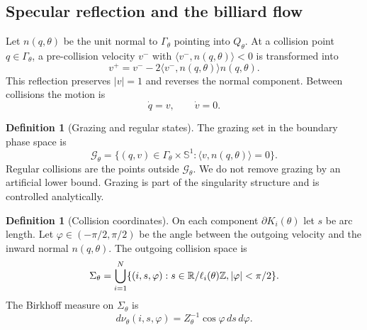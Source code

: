 \documentclass[12pt, letterpaper]{amsart}
\newcommand{\R}{\mathbb{R}}
\newcommand{\Z}{\mathbb{Z}}
\theoremstyle{plain}
\theoremstyle{definition}
\newtheorem{definition}[theorem]{Definition}
\theoremstyle{remark}
\begin{document}
\subsection{Specular reflection and the billiard flow}

Let $n(q,\theta)$ be the unit normal to $\Gamma_\theta$ pointing into $Q_\theta$.  At a collision point $q\in\Gamma_\theta$, a pre-collision velocity $v^-$ with $\langle v^-,n(q,\theta)\rangle<0$ is transformed into
\begin{equation}
    v^+=v^- -2\langle v^-,n(q,\theta)\rangle n(q,\theta).
\end{equation}
This reflection preserves $|v|=1$ and reverses the normal component.  Between collisions the motion is
\begin{equation}
    \dot q=v,\qquad \dot v=0 .
\end{equation}

\begin{definition}[Grazing and regular states]
\label{def:grazing_regular_states}
The grazing set in the boundary phase space is
\begin{equation}
    \mathcal G_\theta
    =\{(q,v)\in \Gamma_\theta\times\mathbb S^1: \langle v,n(q,\theta)\rangle=0\}.
\end{equation}
Regular collisions are the points outside $\mathcal G_\theta$.  We do not remove grazing by an artificial lower bound.  Grazing is part of the singularity structure and is controlled analytically.
\end{definition}

\begin{definition}[Collision coordinates]
\label{def:collision_coordinates}
On each component $\partial K_i(\theta)$ let $s$ be arc length.  Let $\varphi\in(-\pi/2,\pi/2)$ be the angle between the outgoing velocity and the inward normal $n(q,\theta)$.  The outgoing collision space is
\begin{equation}
    \Sigma_\theta=\bigcup_{i=1}^N \{(i,s,\varphi):s\in\R/\ell_i(\theta)\Z,\\ |\varphi|<\pi/2\}.
\end{equation}
The Birkhoff measure on $\Sigma_\theta$ is
\begin{equation}
    d\nu_\theta(i,s,\varphi)=Z_\theta^{-1}\cos\varphi\,ds\,d\varphi .
\end{equation}
\end{definition}
\end{document}
